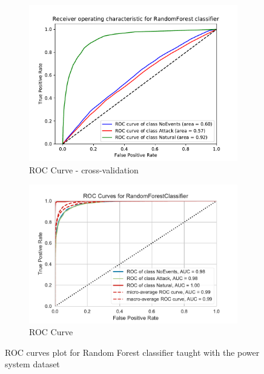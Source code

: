 \begin{figure}[h]
    \centering
    \begin{subfigure}[t]{110mm}
        \centering
        \includegraphics[page=1, width=\linewidth]{images/results_scikit/RandomForest}
        \caption{ROC Curve - cross-validation}
        \label{fig:scikit_RF_ROC}
    \end{subfigure}
    \begin{subfigure}[t]{110mm}
        \centering
        \includegraphics[page=1, width=\linewidth]{images/roc_3c}
        \caption{ROC Curve}
        \label{fig:scikit_RF_ROC}
    \end{subfigure}
    \caption{ROC curves plot for Random Forest classifier taught with the power system dataset}
    \label{fig:ROCCM_RF}
\end{figure}


